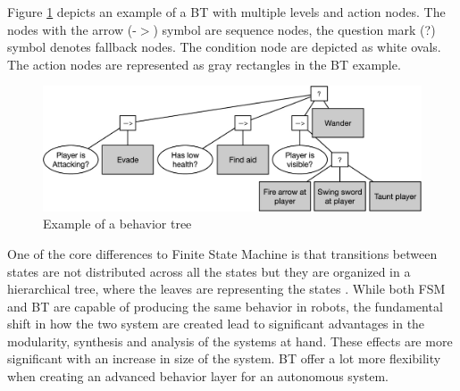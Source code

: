 Figure \ref{fig:bt_example} depicts an example of a BT with multiple levels and action nodes. The nodes with the arrow (-$>$) symbol are sequence nodes, the question mark (?) symbol denotes fallback nodes. The condition node are depicted as white ovals. The action nodes are represented as gray rectangles in the BT example.

\begin{figure}[h!]
	\label{fig:bt_example}
	\includegraphics[width=1.0\textwidth]{images/bt_example.jpg} 
	\caption{Example of a behavior tree \cite{iovino2022} }
\end{figure}

One of the core differences to Finite State Machine is that transitions between states are not distributed across all the states but they are organized in a hierarchical tree, where the leaves are representing the states \cite{iovino2022}. While both FSM and BT are capable of producing the same behavior in robots, the fundamental shift in how the two system are created lead to significant advantages in the modularity, synthesis and analysis of the systems at hand. These effects are more significant with an increase in size of the system. BT offer a lot more flexibility when creating an advanced behavior layer for an autonomous system. 






